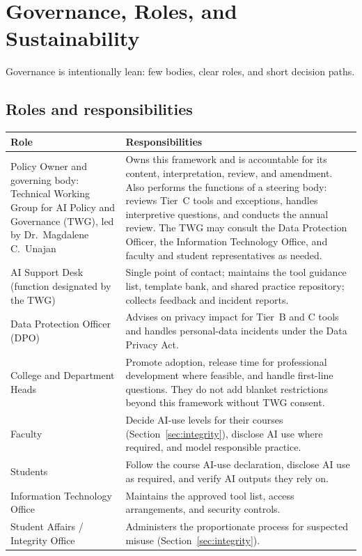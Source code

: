 \section{Governance, Roles, and Sustainability}\label{sec:governance}

Governance is intentionally lean: few bodies, clear roles, and short decision paths.

\subsection{Roles and responsibilities}
\begin{longtable}{@{}p{3.6cm}p{11.4cm}@{}}
\toprule
Role & Responsibilities \\
\midrule
\endhead
Policy Owner and governing body: Technical Working Group for AI Policy and Governance (TWG), led by Dr.\ Magdalene C.\ Unajan & Owns this framework and is accountable for its content, interpretation, review, and amendment. Also performs the functions of a steering body: reviews Tier~C tools and exceptions, handles interpretive questions, and conducts the annual review. The TWG may consult the Data Protection Officer, the Information Technology Office, and faculty and student representatives as needed. \\
AI Support Desk (function designated by the TWG) & Single point of contact; maintains the tool guidance list, template bank, and shared practice repository; collects feedback and incident reports. \\
Data Protection Officer (DPO) & Advises on privacy impact for Tier~B and C tools and handles personal-data incidents under the Data Privacy Act. \\
College and Department Heads & Promote adoption, release time for professional development where feasible, and handle first-line questions. They do not add blanket restrictions beyond this framework without TWG consent. \\
Faculty & Decide AI-use levels for their courses (Section~\ref{sec:integrity}), disclose AI use where required, and model responsible practice. \\
Students & Follow the course AI-use declaration, disclose AI use as required, and verify AI outputs they rely on. \\
Information Technology Office & Maintains the approved tool list, access arrangements, and security controls. \\
Student Affairs / Integrity Office & Administers the proportionate process for suspected misuse (Section~\ref{sec:integrity}). \\
\bottomrule
\end{longtable}


